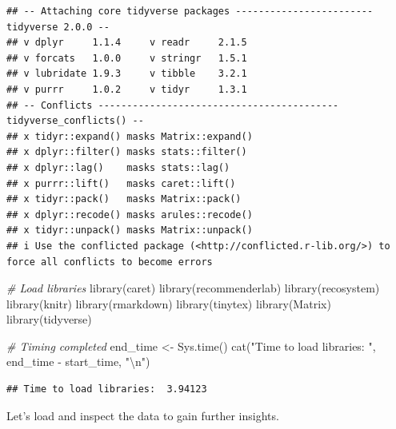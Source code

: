 \documentclass[
]{article}
\newenvironment{Shaded}{}{}
\newcommand{\CommentTok}[1]{\textcolor[rgb]{0.38,0.63,0.69}{\textit{#1}}}
\newcommand{\FunctionTok}[1]{\textcolor[rgb]{0.02,0.16,0.49}{#1}}
\newcommand{\NormalTok}[1]{#1}
\newcommand{\OtherTok}[1]{\textcolor[rgb]{0.00,0.44,0.13}{#1}}
\newcommand{\SpecialCharTok}[1]{\textcolor[rgb]{0.25,0.44,0.63}{#1}}
\newcommand{\StringTok}[1]{\textcolor[rgb]{0.25,0.44,0.63}{#1}}
\begin{document}
\begin{verbatim}
## -- Attaching core tidyverse packages ------------------------ tidyverse 2.0.0 --
## v dplyr     1.1.4     v readr     2.1.5
## v forcats   1.0.0     v stringr   1.5.1
## v lubridate 1.9.3     v tibble    3.2.1
## v purrr     1.0.2     v tidyr     1.3.1
## -- Conflicts ------------------------------------------ tidyverse_conflicts() --
## x tidyr::expand() masks Matrix::expand()
## x dplyr::filter() masks stats::filter()
## x dplyr::lag()    masks stats::lag()
## x purrr::lift()   masks caret::lift()
## x tidyr::pack()   masks Matrix::pack()
## x dplyr::recode() masks arules::recode()
## x tidyr::unpack() masks Matrix::unpack()
## i Use the conflicted package (<http://conflicted.r-lib.org/>) to force all conflicts to become errors
\end{verbatim}

\begin{Shaded}
\begin{Highlighting}[]
\CommentTok{\# Load libraries}
\FunctionTok{library}\NormalTok{(caret)}
\FunctionTok{library}\NormalTok{(recommenderlab)}
\FunctionTok{library}\NormalTok{(recosystem)}
\FunctionTok{library}\NormalTok{(knitr)}
\FunctionTok{library}\NormalTok{(rmarkdown)}
\FunctionTok{library}\NormalTok{(tinytex)}
\FunctionTok{library}\NormalTok{(Matrix)}
\FunctionTok{library}\NormalTok{(tidyverse)}

\CommentTok{\# Timing completed}
\NormalTok{end\_time }\OtherTok{\textless{}{-}} \FunctionTok{Sys.time}\NormalTok{()}
\FunctionTok{cat}\NormalTok{(}\StringTok{"Time to load libraries: "}\NormalTok{, end\_time }\SpecialCharTok{{-}}\NormalTok{ start\_time, }\StringTok{"}\SpecialCharTok{\textbackslash{}n}\StringTok{"}\NormalTok{)}
\end{Highlighting}
\end{Shaded}

\begin{verbatim}
## Time to load libraries:  3.94123
\end{verbatim}

Let's load and inspect the data to gain further insights.
\end{document}

